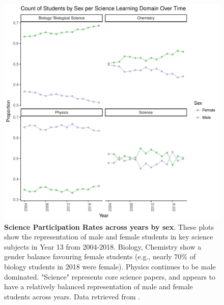 \begin{figure}
    \centering
    \includegraphics{C2 - Student Pathways/STEM_Participation_Y13_Proportion_Science_Sex.pdf}
    \caption{\textbf{Science Participation Rates across years by sex}. These plots show the representation of male and female students in key science subjects in Year 13 from 2004-2018. Biology, Chemistry show a gender balance favouring female students (e.g., nearly 70\% of biology students in 2018 were female). Physics continues to be male dominated. "Science" represents core science papers, and appears to have a relatively balanced representation of male and female students across years. Data retrieved from \cite{EducationCounts_2018}.}
    \label{fig:STEM_Participation_Sex}
\end{figure}

